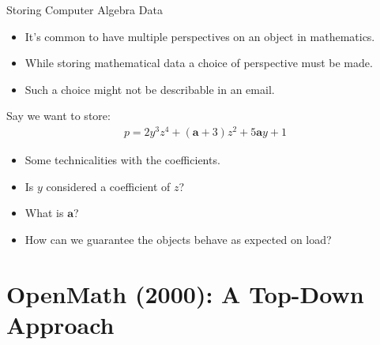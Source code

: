 \documentclass[9pt]{beamer}
\begin{document}

\begin{frame}[fragile]{Storing Computer Algebra Data}
  \begin{itemize}
  \item It's common to have multiple perspectives on an object in mathematics.
  \item While storing mathematical data a choice of perspective must be made.
  \item Such a choice might not be describable in an email.
  \end{itemize}

  Say we want to store:
  \begin{align*}
    p = 2y^3z^4 + (\mathbf{a} + 3)z^2 + 5\mathbf{a}y + 1
  \end{align*} \pause

  \begin{itemize}
  \item Some technicalities with the coefficients.
  \item Is $y$ considered a coefficient of $z$?
  \item What is $\mathbf{a}$? \pause
  \item How can we guarantee the objects behave as expected on load?
  \end{itemize}
\end{frame}


\section{OpenMath (2000): A Top-Down Approach}
\end{document}
